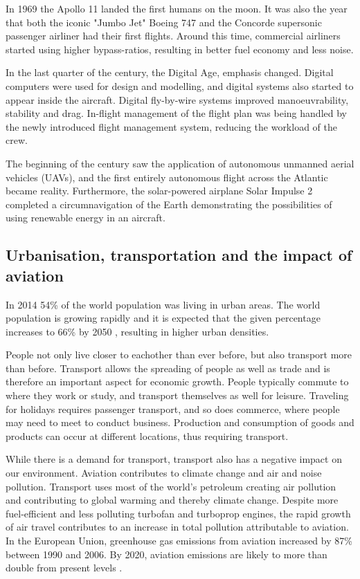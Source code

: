 In 1969 the Apollo 11 landed the first humans on the moon. It was also the year
that both the iconic "Jumbo Jet" Boeing 747 and the Concorde supersonic
passenger airliner had their first flights.
Around this time, commercial airliners started using higher bypass-ratios, resulting in
better fuel economy and less noise. %

In the last quarter of the  century, the Digital Age, emphasis changed.
Digital computers were used for design and modelling, and digital systems also
started to appear inside the aircraft. Digital fly-by-wire systems improved
manoeuvrability, stability and drag. In-flight management of the flight plan was
being handled by the newly introduced flight management system, reducing the
workload of the crew.

The beginning of the  century saw the application of autonomous unmanned
aerial vehicles (UAVs), and the first entirely autonomous flight across the
Atlantic became reality. Furthermore, the solar-powered airplane Solar Impulse 2
completed a circumnavigation of the Earth demonstrating the possibilities of
using renewable energy in an aircraft.

\subsection{Urbanisation, transportation and the impact of aviation}
In 2014 54\% of the world population was living in urban areas. %
The world population is growing rapidly and it is expected that the given
percentage increases to 66\% by 2050 \cite{UnitedNations2014}, resulting
in higher urban densities.

People not only live closer to eachother than ever before, but also transport
more than before. Transport allows the spreading of people as well as trade and
is therefore an important aspect for economic growth. People typically commute
to where they work or study, and transport themselves as well for leisure.
Traveling for holidays requires passenger transport, and so does commerce, where
people may need to meet to conduct business. Production and consumption of goods
and products can occur at different locations, thus requiring transport.

While there is a demand for transport, transport also has a negative impact on
our environment. Aviation contributes to climate change and air and noise
pollution. Transport uses most of the world's petroleum creating air pollution
and contributing to global warming and thereby climate change. Despite more
fuel-efficient and less polluting turbofan and turboprop engines, the rapid
growth of air travel contributes to an increase in total pollution attributable
to aviation. In the European Union, greenhouse gas emissions from aviation
increased by 87\% between 1990 and 2006. By 2020, aviation emissions are likely
to more than double from present levels \cite{European2006}.

